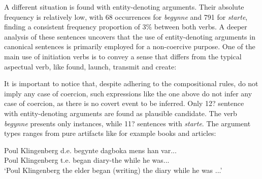 \documentclass{article}
\begin{document}
A different situation is found with entity-denoting arguments. Their absolute frequency is relatively low, with 68 occurrences for \emph{begynne} and 791 for \emph{starte}, finding a consistent frequency proportion of 3\% between both verbs.
A deeper analysis of these sentences uncovers that the use of entity-denoting arguments in canonical sentences is primarily employed for a non-coercive purpose. One of the main use of initiation verbs is to convey a sense that differs from the typical aspectual verb, like found, launch, transmit and create:
        \label{begin_noun1} %
        \z

 

It is important to notice that, despite adhering to the compositional rules, do not imply any case of coercion, such expressions like the one above do not infer any case of coercion, as there is no covert event to be inferred.
Only 12? sentence with entity-denoting arguments are found as plausible candidate. The verb \emph{begynne} presents only instances, while 11? sentences with \emph{starte}. The argument types ranges from pure artifacts like for example books and articles: 

        \ea \label{begin_noun1} %

        \gll Poul Klingenberg d.e. begynte dagboka mens han var...\\
             Poul Klingenberg t.e. began diary-the while he was...\\
        \glt ‘Poul Klingenberg the elder began (writing) the diary while he was ...’
        \z
        
\end{document}
